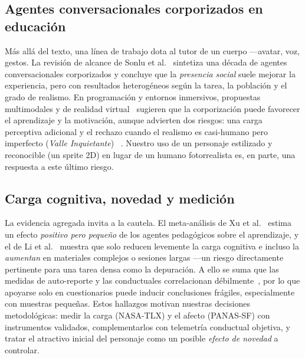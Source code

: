\documentclass[conference]{IEEEtran}
\begin{document}
\subsection{Agentes conversacionales corporizados en educaci\'on}
M\'as all\'a del texto, una l\'inea de trabajo dota al tutor de un cuerpo ---avatar, voz, gestos.
La revisi\'on de alcance de Sonlu et al.~\cite{sonlu2024scoping} sintetiza una d\'ecada de agentes
conversacionales corporizados y concluye que la \emph{presencia social} suele mejorar la
experiencia, pero con resultados heterog\'eneos seg\'un la tarea, la poblaci\'on y el grado de
realismo. En programaci\'on y entornos inmersivos, propuestas multimodales y de realidad
virtual~\cite{elhajji2025architecture,yang2025embodied} sugieren que la corporizaci\'on puede
favorecer el aprendizaje y la motivaci\'on, aunque advierten dos riesgos: una carga perceptiva
adicional y el rechazo cuando el realismo es casi-humano pero imperfecto (\emph{Valle Inquietante})
~\cite{mori1970uncanny}. Nuestro uso de un personaje estilizado y reconocible (un sprite 2D) en
lugar de un humano fotorrealista es, en parte, una respuesta a este \'ultimo riesgo.

\subsection{Carga cognitiva, novedad y medici\'on}
La evidencia agregada invita a la cautela. El meta-an\'alisis de Xu et al.~\cite{xu2026educationalagents}
estima un efecto \emph{positivo pero peque\~no} de los agentes pedag\'ogicos sobre el aprendizaje, y
el de Li et al.~\cite{li2025cognitiveload} muestra que solo reducen levemente la carga cognitiva e
incluso la \emph{aumentan} en materiales complejos o sesiones largas ---un riesgo directamente
pertinente para una tarea densa como la depuraci\'on. A ello se suma que las medidas de auto-reporte
y las conductuales correlacionan d\'ebilmente~\cite{dang2020selfreport}, por lo que apoyarse solo en
cuestionarios puede inducir conclusiones fr\'agiles, especialmente con muestras peque\~nas. Estos
hallazgos motivan nuestras decisiones metodol\'ogicas: medir la carga (NASA-TLX) y el afecto
(PANAS-SF) con instrumentos validados, complementarlos con telemetr\'ia conductual objetiva, y
tratar el atractivo inicial del personaje como un posible \emph{efecto de novedad} a controlar.
\end{document}
